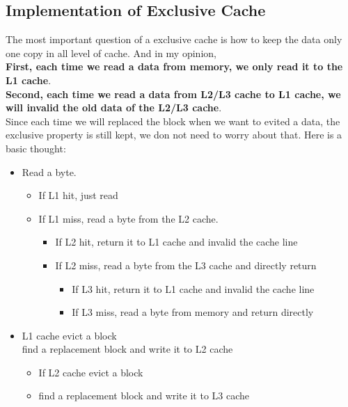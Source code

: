 \documentclass{article}
\begin{document}
\subsection{Implementation of Exclusive Cache}
The most important question of a exclusive cache is how to keep the data only one copy in all level of cache. And in my opinion,\\\textbf{First, each time we read a data from memory, we only read it to the L1 cache}. \\\textbf{Second, each time we read a data from L2/L3 cache to L1 cache, we will invalid the old data of the L2/L3 cache}.\\ Since each time we will replaced the block when we want to evited a data, the exclusive property is still kept, we don not need to worry about that. Here is a basic thought:
\begin{itemize}
    \item Read a byte.
        \begin{itemize}
            \item If L1 hit, just read
            \item If L1 miss, read a byte from the L2 cache.
                \begin{itemize}
                    \item If L2 hit, return it to L1 cache and invalid the cache line
                    \item If L2 miss, read a byte from the L3 cache and directly return
                        \begin{itemize}
                            \item If L3 hit, return it to L1 cache and invalid the cache line
                            \item If L3 miss, read a byte from memory and return directly 
                        \end{itemize}
                \end{itemize}
        \end{itemize} 
    \item L1 cache evict a block\\find a replacement block and write it to L2 cache
            \begin{itemize}
                    \item If L2 cache evict a block
                    \item find a replacement block and write it to L3 cache
                            \begin{itemize}

\end{itemize}
\end{itemize}
\end{itemize}
\end{document}
